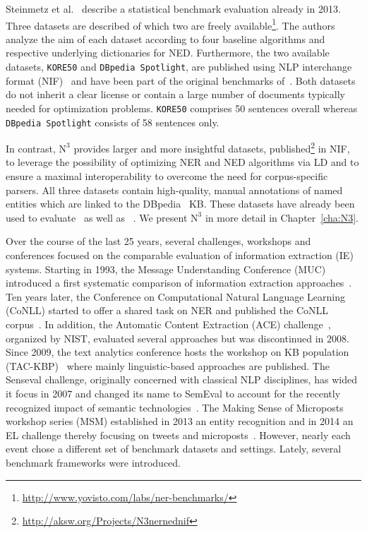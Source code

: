 \bigskip

Steinmetz et al.~\cite{steinmetz-n-2013-statistical} describe a statistical benchmark evaluation already in 2013.
Three datasets are described of which two are freely available\footnote{\url{http://www.yovisto.com/labs/ner-benchmarks/}}.
The authors analyze the aim of each dataset according to four baseline algorithms and respective underlying dictionaries for NED.
Furthermore, the two available datasets, \texttt{KORE50} and \texttt{DBpedia Spotlight}, are published using NLP interchange format (NIF)~\cite{ISWC2013NIF} and have been part of the original benchmarks of~\cite{AIDA,spotlight}. 
Both datasets do not inherit a clear license or contain a large number of documents typically needed for optimization problems.
\texttt{KORE50} comprises 50 sentences overall whereas \texttt{DBpedia Spotlight} consists of 58 sentences only. 

In contrast,  $\mbox{N}^3$ provides larger and more insightful datasets, published\footnote{\url{http://aksw.org/Projects/N3nernednif}} in NIF, to leverage the possibility of optimizing NER and NED algorithms via \ac{LD} and to ensure a maximal interoperability to overcome the need for corpus-specific parsers. 
All three datasets contain high-quality, manual annotations of named entities which are linked to the DBpedia~\cite{dbpedia-swj} \ac{KB}.
These datasets have already been used to evaluate~\cite{AIDA,spotlight} as well as ~\cite{GER+13,agdistis_iswc,GERBIL}.
We present $\mbox{N}^3$ in more detail in Chapter~\ref{cha:N3}.


\bigskip

Over the course of the last 25 years, several challenges, workshops and conferences focused on the comparable evaluation of information extraction (IE) systems. 
Starting in 1993, the Message Understanding Conference (MUC) introduced a first systematic comparison of information extraction approaches~\cite{Sundheim:1993:TIE:1072017.1072023}.
Ten years later, the Conference on Computational Natural Language Learning (CoNLL) started to offer a shared task on \ac{NER} and published the CoNLL corpus~\cite{conll2003}.
In addition, the Automatic Content Extraction (ACE) challenge~\cite{doddington2004automatic}, organized by NIST, evaluated several approaches but was discontinued in 2008. 
Since 2009, the text analytics conference hosts the workshop on \ac{KB} population (TAC-KBP)~\cite{mcnamee2009overview} where mainly linguistic-based approaches are published.
The Senseval challenge, originally concerned with classical NLP disciplines, has wided it focus in 2007 and changed its name to SemEval to account for the recently recognized impact of semantic technologies~\cite{kilgarri1998senseval}.
The Making Sense of Microposts workshop series (MSM) established in 2013 an entity recognition and in 2014 an \ac{EL} challenge thereby focusing on tweets and microposts~\cite{MSM2014}.
However, nearly each event chose a different set of benchmark datasets and settings. 
Lately, several benchmark frameworks were introduced.

